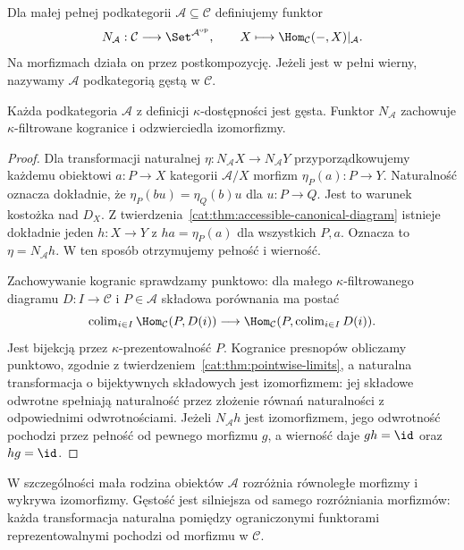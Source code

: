 \begin{definicja}\label{cat:def:accessible-restricted-yoneda}
Dla małej pełnej podkategorii $\mathcal A\subseteq\mathcal C$ definiujemy funktor
\[
 N_{\mathcal A}:\mathcal C\longrightarrow
 \Set^{\mathcal A^{\mathrm{op}}},\qquad
 X\longmapsto \Hom_{\mathcal C}(-,X)|_{\mathcal A}.
\]
Na morfizmach działa on przez postkompozycję. Jeżeli jest w pełni wierny, nazywamy $\mathcal A$ podkategorią gęstą w $\mathcal C$.
\end{definicja}

\begin{wniosek}\label{cat:cor:accessible-density}
Każda podkategoria $\mathcal A$ z definicji $\kappa$-dostępności jest gęsta. Funktor $N_{\mathcal A}$ zachowuje $\kappa$-filtrowane kogranice i odzwierciedla izomorfizmy.
\end{wniosek}
\begin{proof}
Dla transformacji naturalnej $\eta:N_{\mathcal A}X\to N_{\mathcal A}Y$ przyporządkowujemy każdemu obiektowi $a:P\to X$ kategorii $\mathcal A/X$ morfizm $\eta_P(a):P\to Y$. Naturalność oznacza dokładnie, że $\eta_P(bu)=\eta_Q(b)u$ dla $u:P\to Q$. Jest to warunek kostożka nad $D_X$. Z twierdzenia~\ref{cat:thm:accessible-canonical-diagram} istnieje dokładnie jeden $h:X\to Y$ z $ha=\eta_P(a)$ dla wszystkich $P,a$. Oznacza to $\eta=N_{\mathcal A}h$. W ten sposób otrzymujemy pełność i wierność.

Zachowywanie kogranic sprawdzamy punktowo: dla małego $\kappa$-filtrowanego diagramu $D:I\to\mathcal C$ i $P\in\mathcal A$ składowa porównania ma postać
\[
 \operatorname{colim}_{i\in I}\Hom_{\mathcal C}(P,D(i))
 \longrightarrow \Hom_{\mathcal C}(P,\operatorname{colim}_{i\in I}D(i)).
\]
Jest bijekcją przez $\kappa$-prezentowalność $P$. Kogranice presnopów obliczamy punktowo, zgodnie z twierdzeniem~\ref{cat:thm:pointwise-limits}, a naturalna transformacja o bijektywnych składowych jest izomorfizmem: jej składowe odwrotne spełniają naturalność przez złożenie równań naturalności z odpowiednimi odwrotnościami. Jeżeli $N_{\mathcal A}h$ jest izomorfizmem, jego odwrotność pochodzi przez pełność od pewnego morfizmu $g$, a wierność daje $gh=\id$ oraz $hg=\id$.
\end{proof}

W szczególności mała rodzina obiektów $\mathcal A$ rozróżnia równoległe morfizmy i wykrywa izomorfizmy. Gęstość jest silniejsza od samego rozróżniania morfizmów: każda transformacja naturalna pomiędzy ograniczonymi funktorami reprezentowalnymi pochodzi od morfizmu w $\mathcal C$.

